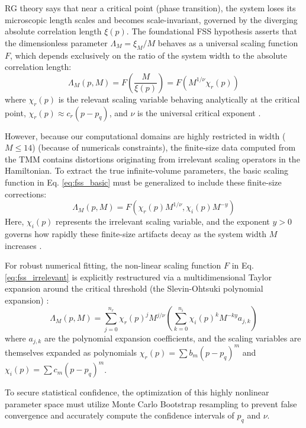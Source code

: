 \documentclass[11pt,a4paper]{article}
\begin{document}
RG theory says that near a critical point (phase transition), the system loses its microscopic length scales and becomes scale-invariant, governed by the diverging absolute correlation length $\xi(p)$. The foundational FSS hypothesis asserts that the dimensionless parameter $\Lambda_M = \xi_M / M$ behaves as a universal scaling function $F$, which depends exclusively on the ratio of the system width to the absolute correlation length:
\begin{equation}
\Lambda_M(p, M) = F\left( \frac{M}{\xi(p)} \right) = F\left( M^{1/\nu} \chi_r(p) \right) \label{eq:fss_basic}
\end{equation}
where $\chi_r(p)$ is the relevant scaling variable behaving analytically at the critical point, $\chi_r(p) \approx c_r (p - p_q)$, and $\nu$ is the universal critical exponent \cite{Slevin1999, Ujfalusi2014}.

However, because our computational domains are highly restricted in width ($M \leq 14$) (because of numericals constraints), the finite-size data computed from the TMM contains distortions originating from irrelevant scaling operators in the Hamiltonian. To extract the true infinite-volume parameters, the basic scaling function in Eq. \ref{eq:fss_basic} must be generalized to include these finite-size corrections:
\begin{equation}
\Lambda_M(p, M) = F\left( \chi_r(p) M^{1/\nu}, \chi_i(p) M^{-y} \right) \label{eq:fss_irrelevant}
\end{equation}
Here, $\chi_i(p)$ represents the irrelevant scaling variable, and the exponent $y > 0$ governs how rapidly these finite-size artifacts decay as the system width $M$ increases \cite{Slevin1999}. 

For robust numerical fitting, the non-linear scaling function $F$ in Eq. \ref{eq:fss_irrelevant} is explicitly restructured via a multidimensional Taylor expansion around the critical threshold (the Slevin-Ohtsuki polynomial expansion) \cite{Slevin2014}:
\begin{equation}
\Lambda_M(p, M) = \sum_{j=0}^{n_r} \chi_r(p)^j M^{j/\nu} \left( \sum_{k=0}^{n_i} \chi_i(p)^k M^{-k y} a_{j,k} \right) \label{eq:fss_polynomial}
\end{equation}
where $a_{j,k}$ are the polynomial expansion coefficients, and the scaling variables are themselves expanded as polynomials $\chi_r(p) = \sum b_m (p - p_q)^m$ and $\chi_i(p) = \sum c_m (p - p_q)^m$. 

To secure statistical confidence, the optimization of this highly nonlinear parameter space must utilize Monte Carlo Bootstrap resampling to prevent false convergence and accurately compute the confidence intervals of $p_q$ and $\nu$.
\end{document}
